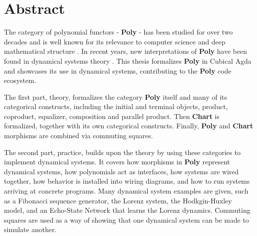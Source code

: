 
\thispagestyle{plain}			%
\section*{Abstract}

The category of polynomial functors - \textbf{Poly} - has been studied for over two decades and is well known for its relevance to computer science \cite{containersPaper} and deep mathematical structure \cite{polynomialFunctorsCategory}.
In recent years, new interpretations of \textbf{Poly} have been found in dynamical systems theory \cite{poly-book}. 
This thesis formalizes \textbf{Poly} in Cubical Agda and showcases its use in dynamical systems, contributing to the \textbf{Poly} code ecosystem.

The first part, theory, formalizes the category \textbf{Poly} itself and many of its categorical constructs, including the initial and terminal objects, product, coproduct, equalizer, composition and parallel product. %
Then \textbf{Chart} is formalized, together with its own categorical constructs.
Finally, \textbf{Poly} and \textbf{Chart} morphisms are combined via commuting squares.   %

The second part, practice, builds upon the theory by using these categories to implement dynamical systems.
It covers how morphisms in \textbf{Poly} represent dynamical systems, how polynomials act as interfaces, how
systems are wired together, how behavior is installed into wiring diagrams, and how to run systems arriving at concrete programs.
Many dynamical system examples are given, such as a Fibonacci sequence generator, the Lorenz system, the Hodkgin-Huxley model, and an Echo-State Network that learns the Lorenz dynamics. %
Commuting squares are used as a way of showing that one dynamical system can be made to simulate another.



